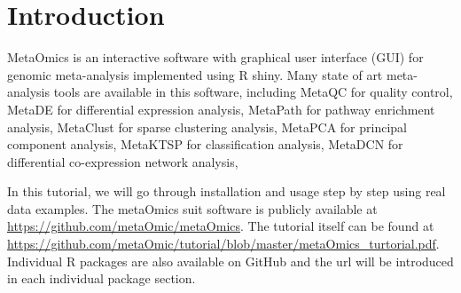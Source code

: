 \section{Introduction}
 
MetaOmics is an interactive software with graphical user interface (GUI) for genomic meta-analysis implemented using R shiny.
Many state of art meta-analysis tools are available in this software,
including MetaQC for quality control, 
MetaDE for differential expression analysis,
MetaPath for pathway enrichment analysis,
MetaClust for sparse clustering analysis,
MetaPCA for principal component analysis,
MetaKTSP for classification analysis,
MetaDCN for differential co-expression network analysis,

In this tutorial, 
we will go through installation and usage step by step using real data examples.
The metaOmics suit software is publicly available at \url{https://github.com/metaOmic/metaOmics}.
The tutorial itself can be found at \url{https://github.com/metaOmic/tutorial/blob/master/metaOmics_turtorial.pdf}.
Individual R packages are also available on GitHub and the url will be introduced in each individual package section.


